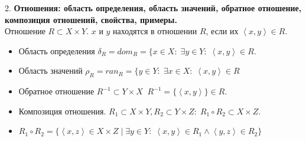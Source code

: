 \documentclass[12pt]{article}
\begin{document}
2. \textbf{Отношения: область определения, область значений, обратное отношение, композиция отношений, свойства, примеры.}\\
Отношение $R \subset X \times Y$. $x$ и $y$ находятся в отношении $R$, если их $\left<x, y\right> \in R$.
\begin{itemize}
    \item Область определения $\delta_R = {dom}_R = \{x \in X: \; \exists y \in Y: \; \left<x, y\right> \in R$.
    \item Область значений $\rho_R = {ran}_R = \{y \in Y: \; \exists x \in X: \; \left<x, y\right> \in R$
    \item Обратное отношение $R^{-1} \subset Y \times X \; \; R^{-1} = \{\left<x,y\right>\} \in R$.
    \item Композиция отношения. $R_1 \subset X \times Y, R_2 \subset Y \times Z: \; R_1 \circ R_2 \subset X \times Z$.
    \item $R_1 \circ R_2 = \{\left<x, z\right> \in X \times Z\; \vert \; \exists y \in Y: \; \left<x,y\right> \in R_1 \land \left<y,z\right> \in R_2\}$
\end{itemize}
\end{document}
